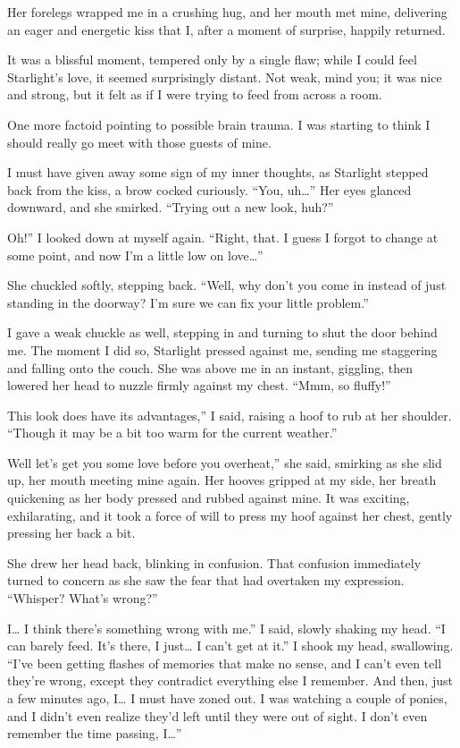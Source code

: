 Her forelegs wrapped me in a crushing hug, and her mouth met mine, delivering an eager and energetic kiss that I, after a moment of surprise, happily returned.

It was a blissful moment, tempered only by a single flaw; while I could feel Starlight’s love, it seemed surprisingly distant. Not weak, mind you; it was nice and strong, but it felt as if I were trying to feed from across a room.

One more factoid pointing to possible brain trauma. I was starting to think I should really go meet with those guests of mine.

I must have given away some sign of my inner thoughts, as Starlight stepped back from the kiss, a brow cocked curiously. “You, uh…” Her eyes glanced downward, and she smirked. “Trying out a new look, huh?”

\leavevmode{}Oh!” I looked down at myself again. “Right, that. I guess I forgot to change at some point, and now I’m a little low on love…”

She chuckled softly, stepping back. “Well, why don’t you come in instead of just standing in the doorway? I’m sure we can fix your little problem.”

I gave a weak chuckle as well, stepping in and turning to shut the door behind me. The moment I did so, Starlight pressed against me, sending me staggering and falling onto the couch. She was above me in an instant, giggling, then lowered her head to nuzzle firmly against my chest. “Mmm, so fluffy!”

\leavevmode{}This look does have its advantages,” I said, raising a hoof to rub at her shoulder. “Though it may be a bit too warm for the current weather.”

\leavevmode{}Well let’s get you some love before you overheat,” she said, smirking as she slid up, her mouth meeting mine again. Her hooves gripped at my side, her breath quickening as her body pressed and rubbed against mine. It was exciting, exhilarating, and it took a force of will to press my hoof against her chest, gently pressing her back a bit.

She drew her head back, blinking in confusion. That confusion immediately turned to concern as she saw the fear that had overtaken my expression. “Whisper? What’s wrong?”

\leavevmode{}I… I think there’s something wrong with me.” I said, slowly shaking my head. “I can barely feed. It’s there, I just… I can’t get at it.” I shook my head, swallowing. “I’ve been getting flashes of memories that make no sense, and I can’t even tell they’re wrong, except they contradict everything else I remember. And then, just a few minutes ago, I… I must have zoned out. I was watching a couple of ponies, and I didn’t even realize they’d left until they were out of sight. I don’t even remember the time passing, I…”

